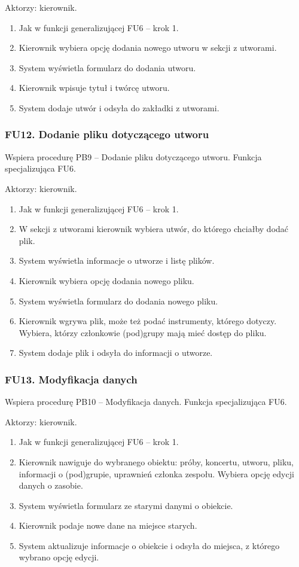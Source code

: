 \documentclass[11pt,a4paper]{article}
\renewcommand{\_}{\char`_}
\begin{document}
Aktorzy: kierownik.
\begin{enumerate}
    \item Jak w funkcji generalizującej FU6 – krok 1.
    \item Kierownik wybiera opcję dodania nowego utworu w sekcji z utworami.
    \item System wyświetla formularz do dodania utworu.
    \item Kierownik wpisuje tytuł i twórcę utworu.
    \item System dodaje utwór i odsyła do zakładki z utworami.
\end{enumerate}

\subsubsection{FU12. Dodanie pliku dotyczącego utworu}

Wspiera procedurę PB9 – Dodanie pliku dotyczącego utworu. Funkcja specjalizująca FU6.

Aktorzy: kierownik.
\begin{enumerate}
    \item Jak w funkcji generalizującej FU6 – krok 1.
    \item W sekcji z utworami kierownik wybiera utwór, do którego chciałby dodać plik.
    \item System wyświetla informacje o utworze i listę plików.
    \item Kierownik wybiera opcję dodania nowego pliku.
    \item System wyświetla formularz do dodania nowego pliku.
    \item Kierownik wgrywa plik, może też podać instrumenty, którego dotyczy. Wybiera, którzy członkowie (pod)grupy mają mieć dostęp do pliku.
    \item System dodaje plik i odsyła do informacji o utworze.
\end{enumerate}

\subsubsection{FU13. Modyfikacja danych}

Wspiera procedurę PB10 – Modyfikacja danych. Funkcja specjalizująca FU6.

Aktorzy: kierownik.
\begin{enumerate}
    \item Jak w funkcji generalizującej FU6 – krok 1.
    \item Kierownik nawiguje do wybranego obiektu: próby, koncertu, utworu, pliku, informacji o (pod)grupie, uprawnień członka zespołu. Wybiera opcję edycji danych o zasobie.
    \item System wyświetla formularz ze starymi danymi o obiekcie.
    \item Kierownik podaje nowe dane na miejsce starych.
    \item System aktualizuje informacje o obiekcie i odsyła do miejsca, z którego wybrano opcję edycji.
\end{enumerate}
\end{document}

